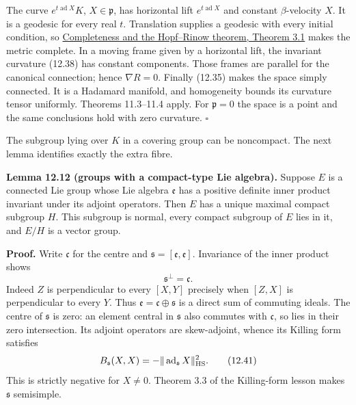 \documentclass[
  11pt,
]{article}
\begin{document}
The curve \(e^{t\operatorname{ad}X}K\), \(X\in\mathfrak p\), has
horizontal lift \(e^{t\operatorname{ad}X}\) and constant
\(\beta\)-velocity \(X\). It is a geodesic for every real \(t\).
Translation supplies a geodesic with every initial condition, so
\href{https://kokunoyumeto.github.io/open-math-courses/courses/DG-FND/completeness-and-the-hopf-rinow-theorem.html}{Completeness
and the Hopf--Rinow theorem, Theorem 3.1} makes the metric complete. In
a moving frame given by a horizontal lift, the invariant curvature
(12.38) has constant components. Those frames are parallel for the
canonical connection; hence \(\nabla R=0\). Finally (12.35) makes the
space simply connected. It is a Hadamard manifold, and homogeneity
bounds its curvature tensor uniformly. Theorems 11.3--11.4 apply. For
\(\mathfrak p=0\) the space is a point and the same conclusions hold
with zero curvature. \(\square\)

The subgroup lying over \(K\) in a covering group can be noncompact. The
next lemma identifies exactly the extra fibre.

\textbf{Lemma 12.12 (groups with a compact-type Lie algebra).} Suppose
\(E\) is a connected Lie group whose Lie algebra \(\mathfrak e\) has a
positive definite inner product invariant under its adjoint operators.
Then \(E\) has a unique maximal compact subgroup \(H\). This subgroup is
normal, every compact subgroup of \(E\) lies in it, and \(E/H\) is a
vector group.

\textbf{Proof.} Write \(\mathfrak c\) for the centre and
\(\mathfrak s=[\mathfrak e,\mathfrak e]\). Invariance of the inner
product shows \[
\mathfrak s^\perp=\mathfrak c.
\tag{12.40}
\] Indeed \(Z\) is perpendicular to every \([X,Y]\) precisely when
\([Z,X]\) is perpendicular to every \(Y\). Thus
\(\mathfrak e=\mathfrak c\oplus\mathfrak s\) is a direct sum of
commuting ideals. The centre of \(\mathfrak s\) is zero: an element
central in \(\mathfrak s\) also commutes with \(\mathfrak c\), so lies
in their zero intersection. Its adjoint operators are skew-adjoint,
whence its Killing form satisfies \[
B_{\mathfrak s}(X,X)
=-\|\operatorname{ad}_{\mathfrak s}X\|_{\rm HS}^2.
\tag{12.41}
\] This is strictly negative for \(X\ne0\). Theorem 3.3 of the
Killing-form lesson makes \(\mathfrak s\) semisimple.
\end{document}
